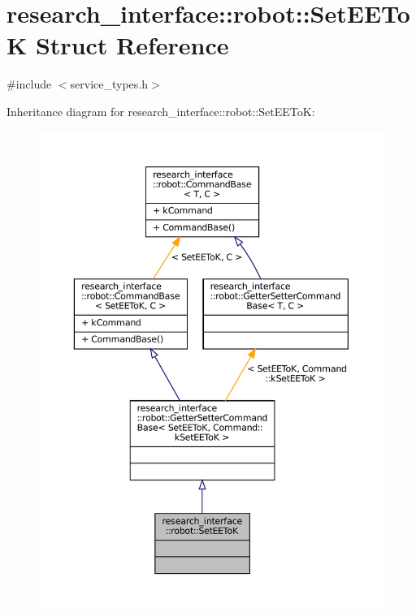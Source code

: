 \hypertarget{structresearch__interface_1_1robot_1_1SetEEToK}{}\section{research\+\_\+interface\+:\+:robot\+:\+:Set\+E\+E\+ToK Struct Reference}
\label{structresearch__interface_1_1robot_1_1SetEEToK}


{\ttfamily \#include $<$service\+\_\+types.\+h$>$}



Inheritance diagram for research\+\_\+interface\+:\+:robot\+:\+:Set\+E\+E\+ToK\+:
\nopagebreak
\begin{figure}[H]
\begin{center}
\leavevmode
\includegraphics[width=350pt]{structresearch__interface_1_1robot_1_1SetEEToK__inherit__graph}
\end{center}
\end{figure}



